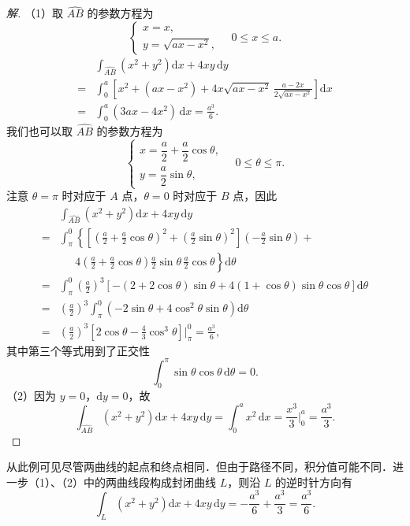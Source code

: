 \begin{proof}[解]
（1）取 $\widehat{AB}$ 的参数方程为
\[
\begin{cases}
x=x,\\
y=\sqrt{ax-x^{2}},
\end{cases}
\quad 0\leqslant x\leqslant a.
\]
\[
\begin{aligned}
&\int_{\widehat{AB}}\left(x^{2}+y^{2}\right)\mathrm{d}x+4xy\,\mathrm{d}y\\
={}&\int_{0}^{a}\left[x^{2}+\left(ax-x^{2}\right)+4x\sqrt{ax-x^{2}}\,\frac{a-2x}{2\sqrt{ax-x^{2}}}\right]\mathrm{d}x\\
={}&\int_{0}^{a}(3ax-4x^{2})\,\mathrm{d}x=\frac{a^{3}}{6}.
\end{aligned}
\]
我们也可以取 $\widehat{AB}$ 的参数方程为
\[
\begin{cases}
x=\dfrac{a}{2}+\dfrac{a}{2}\cos\theta,\\
y=\dfrac{a}{2}\sin\theta,
\end{cases}
\quad 0\leqslant\theta\leqslant\pi.
\]
注意 $\theta=\pi$ 时对应于 $A$ 点，$\theta=0$ 时对应于 $B$ 点，因此
\[
\begin{aligned}
&\int_{\widehat{AB}}\left(x^{2}+y^{2}\right)\mathrm{d}x+4xy\,\mathrm{d}y\\
={}&\int_{\pi}^{0}\left\{\left[\left(\frac{a}{2}+\frac{a}{2}\cos\theta\right)^{2}+\left(\frac{a}{2}\sin\theta\right)^{2}\right]\left(-\frac{a}{2}\sin\theta\right)+\right.\\
&\left.\phantom{\int_{\pi}^{0}}4\left(\frac{a}{2}+\frac{a}{2}\cos\theta\right)\frac{a}{2}\sin\theta\,\frac{a}{2}\cos\theta\right\}\mathrm{d}\theta\\
={}&\int_{\pi}^{0}\left(\frac{a}{2}\right)^{3}\left[-(2+2\cos\theta)\sin\theta+4(1+\cos\theta)\sin\theta\cos\theta\right]\mathrm{d}\theta\\
={}&\left(\frac{a}{2}\right)^{3}\int_{\pi}^{0}\left(-2\sin\theta+4\cos^{2}\theta\sin\theta\right)\mathrm{d}\theta\\
={}&\left(\frac{a}{2}\right)^{3}\left[2\cos\theta-\frac{4}{3}\cos^{3}\theta\right]\Bigg|_{\pi}^{0}=\frac{a^{3}}{6},
\end{aligned}
\]
其中第三个等式用到了正交性
\[
\int_{0}^{\pi}\sin\theta\cos\theta\,\mathrm{d}\theta=0.
\]
（2）因为 $y=0$，$\mathrm{d}y=0$，故
\[
\int_{\widehat{AB}}\left(x^{2}+y^{2}\right)\mathrm{d}x+4xy\,\mathrm{d}y=\int_{0}^{a}x^{2}\,\mathrm{d}x=\frac{x^{3}}{3}\bigg|_{0}^{a}=\frac{a^{3}}{3}.
\]
\end{proof}

从此例可见尽管两曲线的起点和终点相同．但由于路径不同，积分值可能不同．进一步（1）、（2）中的两曲线段构成封闭曲线 $L$，则沿 $L$ 的逆时针方向有
\[
\int_{L}\left(x^{2}+y^{2}\right)\mathrm{d}x+4xy\,\mathrm{d}y=-\frac{a^{3}}{6}+\frac{a^{3}}{3}=\frac{a^{3}}{6}.
\]

